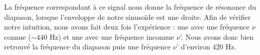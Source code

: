 \documentclass[12pt,a4paper]{article}
\begin{document}
\begin{itemize}
		La fréquence correspondant à ce signal nous donne la fréquence de résonance du diapason, lorsque l'enveloppe de notre sinusoïde est une droite. Afin de vérifier notre intuition, nous avons fait deux fois l'expérience : une avec une fréquence $\nu$ connue ($\sim 440$ Hz) et une avec une fréquence inconnue $\nu$'. Nous avons donc bien retrouvé la fréquence du diapason puis une fréquence $\nu$' d'environ 420 Hz.
	\end{itemize}
\end{document}
